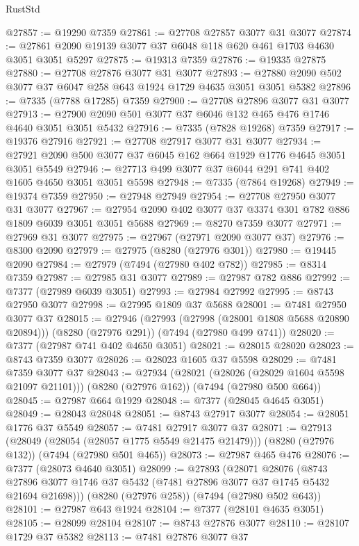 \begin{lexlean}{RustStd}
\begin{coremodule}
@27857 := @19290 @7359
@27861 := @27708 @27857 @3077 @31 @3077
@27874 := @27861 @2090 @19139 @3077 @37 @6048 @118 @620 @461 @1703 @4630 @3051 @3051 @5297
@27875 := @19313 @7359
@27876 := @19335 @27875
@27880 := @27708 @27876 @3077 @31 @3077
@27893 := @27880 @2090 @502 @3077 @37 @6047 @258 @643 @1924 @1729 @4635 @3051 @3051 @5382
@27896 := @7335 (@7788 @17285) @7359
@27900 := @27708 @27896 @3077 @31 @3077
@27913 := @27900 @2090 @501 @3077 @37 @6046 @132 @465 @476 @1746 @4640 @3051 @3051 @5432
@27916 := @7335 (@7828 @19268) @7359
@27917 := @19376 @27916
@27921 := @27708 @27917 @3077 @31 @3077
@27934 := @27921 @2090 @500 @3077 @37 @6045 @162 @664 @1929 @1776 @4645 @3051 @3051 @5549
@27946 := @27713 @499 @3077 @37 @6044 @291 @741 @402 @1605 @4650 @3051 @3051 @5598
@27948 := @7335 (@7864 @19268)
@27949 := @19374 @7359
@27950 := @27948 @27949
@27954 := @27708 @27950 @3077 @31 @3077
@27967 := @27954 @2090 @402 @3077 @37 @3374 @301 @782 @886 @1809 @6039 @3051 @3051 @5688
@27969 := @8270 @7359 @3077
@27971 := @27969 @31 @3077
@27975 := @27967 (@27971 @2090 @3077 @37)
@27976 := @8300 @2090
@27979 := @27975 (@8280 (@27976 @301))
@27980 := @19445 @2090
@27984 := @27979 (@7494 (@27980 @402 @782))
@27985 := @8314 @7359
@27987 := @27985 @31 @3077
@27989 := @27987 @782 @886
@27992 := @7377 (@27989 @6039 @3051)
@27993 := @27984 @27992
@27995 := @8743 @27950 @3077
@27998 := @27995 @1809 @37 @5688
@28001 := @7481 @27950 @3077 @37
@28015 := @27946
    (@27993 (@27998 (@28001 @1808 @5688 @20890 @20894)))
    (@8280 (@27976 @291))
    (@7494 (@27980 @499 @741))
@28020 := @7377 (@27987 @741 @402 @4650 @3051)
@28021 := @28015 @28020
@28023 := @8743 @7359 @3077
@28026 := @28023 @1605 @37 @5598
@28029 := @7481 @7359 @3077 @37
@28043 := @27934
    (@28021 (@28026 (@28029 @1604 @5598 @21097 @21101)))
    (@8280 (@27976 @162))
    (@7494 (@27980 @500 @664))
@28045 := @27987 @664 @1929
@28048 := @7377 (@28045 @4645 @3051)
@28049 := @28043 @28048
@28051 := @8743 @27917 @3077
@28054 := @28051 @1776 @37 @5549
@28057 := @7481 @27917 @3077 @37
@28071 := @27913
    (@28049 (@28054 (@28057 @1775 @5549 @21475 @21479)))
    (@8280 (@27976 @132))
    (@7494 (@27980 @501 @465))
@28073 := @27987 @465 @476
@28076 := @7377 (@28073 @4640 @3051)
@28099 := @27893
    (@28071
      @28076
      (@8743 @27896 @3077 @1746 @37 @5432 (@7481 @27896 @3077 @37 @1745 @5432 @21694 @21698)))
    (@8280 (@27976 @258))
    (@7494 (@27980 @502 @643))
@28101 := @27987 @643 @1924
@28104 := @7377 (@28101 @4635 @3051)
@28105 := @28099 @28104
@28107 := @8743 @27876 @3077
@28110 := @28107 @1729 @37 @5382
@28113 := @7481 @27876 @3077 @37

\end{coremodule}
\end{lexlean}
